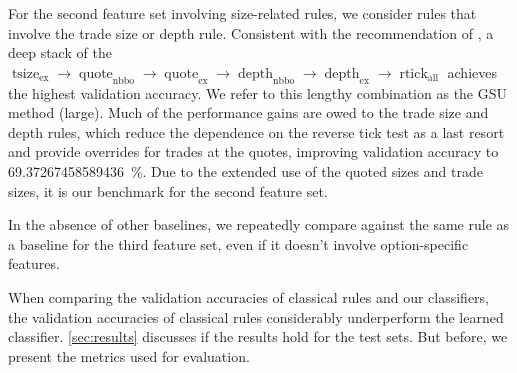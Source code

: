 For the second feature set involving size-related rules, we consider rules that involve the trade size or depth rule. Consistent with the recommendation of \textcite[\checkmark][15]{grauerOptionTradeClassification2022}, a deep stack of the $\operatorname{tsize}_{\mathrm{ex}} \to \operatorname{quote}_{\mathrm{nbbo}} \to \operatorname{quote}_{\mathrm{ex}} \to \operatorname{depth}_{\mathrm{nbbo}} \to \operatorname{depth}_{\mathrm{ex}} \to \operatorname{rtick}_{\mathrm{all}}$ achieves the highest validation accuracy. We refer to this lengthy combination as the \gls{GSU} method (large). Much of the performance gains are owed to the trade size and depth rules, which reduce the dependence on the reverse tick test as a last resort and provide overrides for trades at the quotes, improving validation accuracy to \SI{69.37267458589436}{\percent}. Due to the extended use of the quoted sizes and trade sizes, it is our benchmark for the second feature set.

In the absence of other baselines, we repeatedly compare against the same rule as a baseline for the third feature set, even if it doesn't involve option-specific features.

When comparing the validation accuracies of classical rules and our classifiers, the validation accuracies of classical rules considerably underperform the learned classifier. \cref{sec:results} discusses if the results hold for the test sets. But before, we present the metrics used
for evaluation.